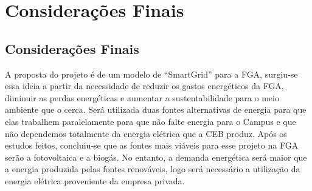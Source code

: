 \part{Considerações Finais}
\chapter[Considerações Finais]{Considerações Finais}

A proposta do projeto é de um modelo de “SmartGrid” para a FGA, surgiu-se essa ideia a partir da necessidade de reduzir os gastos energéticos da FGA, diminuir as perdas energéticas e aumentar a sustentabilidade para o meio ambiente que o cerca. Será utilizada duas fontes alternativas de energia para que elas trabalhem paralelamente para que não falte energia para o Campus e que não dependemos totalmente da energia elétrica que a CEB produz. Após os estudos feitos, concluiu-se que as fontes mais viáveis para esse projeto na FGA serão a fotovoltaica e a biogás. No entanto, a demanda energética será maior que a energia produzida pelas fontes renováveis, logo será necessário a utilização da energia elétrica proveniente da empresa privada.